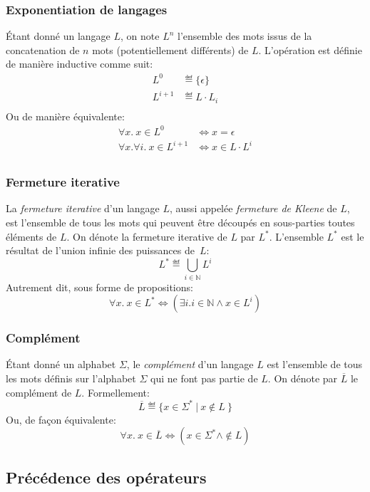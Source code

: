 \subsubsection{Exponentiation de langages}

Étant donné un langage $L$, on note $L^n$ l'ensemble des mots issus de la concatenation de $n$ mots (potentiellement différents) de $L$.
L'opération est définie de manière inductive comme suit:
\begin{align*}
L^0 &\eqdef \{ \epsilon \}\\
L^{i + 1} &\eqdef L \cdot L_i\\
\end{align*}
Ou de manière équivalente:
\begin{align*}
\forall x.\ x \in L^0 &\iff x = \epsilon\\
\forall x. \forall i.\ x \in L^{i + 1} &\iff x \in L \cdot L^i\\
\end{align*}

\subsubsection{Fermeture iterative}

La \og \textit{fermeture iterative} \fg{} d'un langage $L$, aussi appelée \og \textit{fermeture de Kleene} \fg{} de $L$, est l'ensemble de tous les mots qui peuvent être découpés en sous-parties toutes éléments de $L$. On dénote la fermeture iterative de $L$ par $L^*$.
L'ensemble $L^*$ est le résultat de l'union infinie des puissances de~$L$:
\[
L^* \eqdef \bigcup_{i \in \mathbb{N}} L^i
\]
Autrement dit, sous forme de propositions:
\[
\forall x.\ x \in L^* \iff (\exists i. i \in \mathbb{N} \wedge x \in L^i)
\]

\subsubsection{Complément}

Étant donné un alphabet $\Sigma$, le \og \textit{complément} \fg{} d'un langage $L$ est l'ensemble de tous les mots définis sur l'alphabet $\Sigma$ qui ne font pas partie de $L$. On dénote par $\overline{L}$ le complément de $L$.
Formellement:
\[
\overline{L} \eqdef \{ x \in \Sigma^*\ |\ x \not\in L\ \}
\]
Ou, de façon équivalente:
\[
\forall x. \ x \in \overline{L} \iff (x \in \Sigma^* \wedge \not\in L)
\]

\subsection{Précédence des opérateurs}

